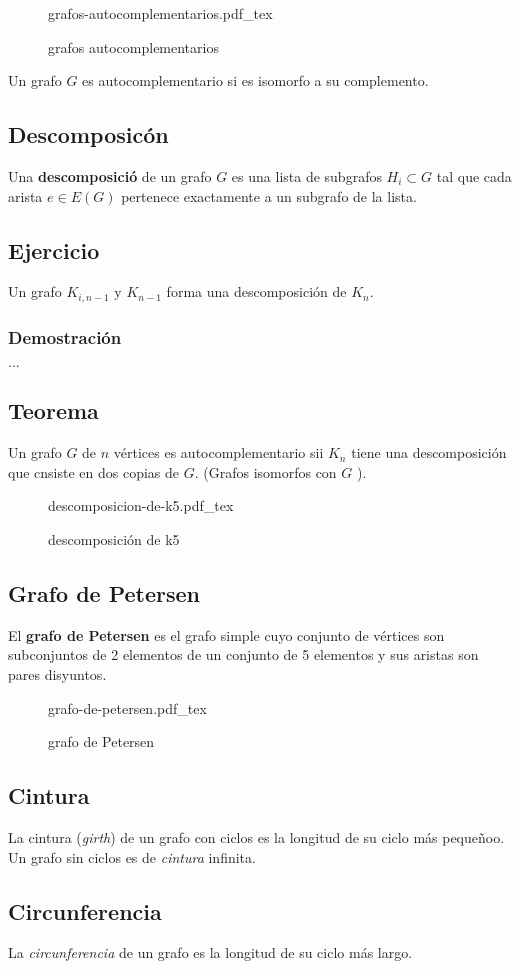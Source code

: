 \documentclass[a4paper]{book}
\newcommand{\incfig}[2][1]{%
    \def\svgwidth{#1\columnwidth}
    {#2.pdf_tex}
}
\begin{document}
\begin{figure}[ht]
    \centering
    \incfig[0.5]{grafos-autocomplementarios}
    \caption{grafos autocomplementarios}
    \label{fig:grafos-autocomplementarios}
\end{figure}

Un grafo \(G\) es autocomplementario si es isomorfo a su complemento.

\subsection{Descomposicón}
\label{ssec:descomposicon}

Una \textbf{descomposició} de un grafo \(G\) es una lista de subgrafos
\(H_{i}\subset G\) tal que cada arista \(e\in E\left(G\right)\) pertenece
exactamente a un subgrafo de la lista.

\subsection{Ejercicio}
Un grafo \(K_{i,n-1} \text{ y } K_{n-1}\) forma una descomposición de \(K_{n}\).

\subsubsection{Demostración}

\(\ldots\)

\subsection{Teorema}

Un grafo \(G\) de \(n\) vértices es autocomplementario sii \(K_{n}\) tiene una
descomposición que cnsiste en dos copias de \(G\). (Grafos isomorfos con \(G\)
).

\begin{figure}[ht]
    \centering
    \incfig[0.5]{descomposicion-de-k5}
    \caption{descomposición de k5}
    \label{fig:descomposición-de-k5}
\end{figure}


\subsection{Grafo de Petersen}
El \textbf{grafo de Petersen} es el grafo simple cuyo conjunto de vértices son
subconjuntos de 2 elementos de un conjunto de 5 elementos y sus aristas son
pares disyuntos.
\begin{figure}[ht]
    \centering
    \incfig[0.5]{grafo-de-petersen}
    \caption{grafo de Petersen}
    \label{fig:grafo-de-petersen}
\end{figure}

\subsection{Cintura}
La cintura (\textit{girth}) de un grafo con ciclos es la longitud de su ciclo
más pequeñoo. Un grafo sin ciclos es de \textit{cintura} infinita.

\subsection{Circunferencia}
La \textit{circunferencia} de un grafo es la longitud de su ciclo más largo.
\end{document}
